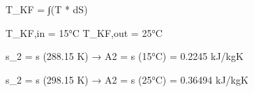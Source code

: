 T_KF = ∫(T * dS)  

T_KF,in = 15°C  
T_KF,out = 25°C  

s_2 = s (288.15 K) → A2  
= s (15°C)  
= 0.2245 kJ/kgK  

s_2 = s (298.15 K) → A2  
= s (25°C)  
= 0.36494 kJ/kgK